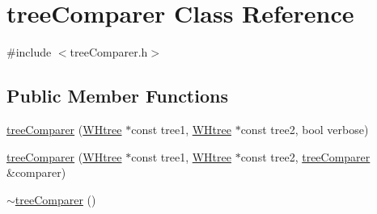 \hypertarget{classtreeComparer}{\section{tree\-Comparer \-Class \-Reference}
\label{classtreeComparer}
}


{\ttfamily \#include $<$tree\-Comparer.\-h$>$}

\subsection*{\-Public \-Member \-Functions}
\begin{DoxyCompactItemize}
\item 
\hyperlink{classtreeComparer_a53551cd3430fa547485ea45e714ad3db}{tree\-Comparer} (\hyperlink{classWHtree}{\-W\-Htree} $\ast$const tree1, \hyperlink{classWHtree}{\-W\-Htree} $\ast$const tree2, bool verbose)
\item 
\hyperlink{classtreeComparer_a40dc7445acfe23391f860f4a84b29f61}{tree\-Comparer} (\hyperlink{classWHtree}{\-W\-Htree} $\ast$const tree1, \hyperlink{classWHtree}{\-W\-Htree} $\ast$const tree2, \hyperlink{classtreeComparer}{tree\-Comparer} \&comparer)
\item 
\hypertarget{classtreeComparer_a24cb1c677cf90de79ab0ac6e175af0ce}{\hyperlink{classtreeComparer_a24cb1c677cf90de79ab0ac6e175af0ce}{$\sim$tree\-Comparer} ()}\label{classtreeComparer_a24cb1c677cf90de79ab0ac6e175af0ce}


\end{DoxyCompactItemize}
